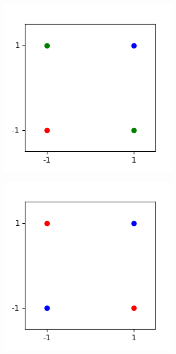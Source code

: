 \documentclass{article}
\begin{document}
\begin{figure}[h]
	\centering
	\begin{subfigure}[t]{0.36\linewidth}
		\centering
		\includegraphics[width = 1.0\linewidth, trim={0 0 0 0}, clip=true]{figures/sum_2d.png}
		\label{fig:sum2d}	
	\end{subfigure}%
	\hspace{0.05 \linewidth}
	\begin{subfigure}[t]{0.36\linewidth}
		\centering
		\includegraphics[width = 1.0\linewidth, trim={0 0 0 0}, clip=true]{figures/prod_2d.png}

\end{subfigure}
\end{figure}
\end{document}
